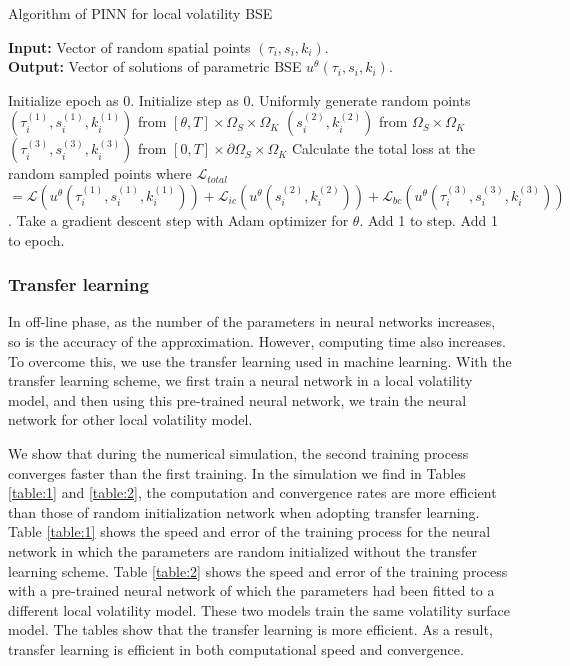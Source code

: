\documentclass[11pt,reqno]{article}
\numberwithin{equation}{section}
\begin{document}
{%
\begin{algorithm}[H]\small
\caption{Algorithm of PINN for local volatility BSE}
    \textbf{Input:}
    Vector of random spatial points $(\tau_i, s_i, k_i)$. \\
    \textbf{Output:}
    Vector of solutions of parametric BSE $u^{\theta}(\tau_i, s_i, k_i)$.
\begin{algorithmic}
    \State Initialize epoch as 0.
        \State Initialize step as 0.
        \State Uniformly generate random points
        \State $(\tau_i^{(1)},s_i^{(1)},k_i^{(1)})$ from $[\theta,T]\times\Omega_S\times\Omega_K$
        \State $(s_i^{(2)},k_i^{(2)})$ from $\Omega_S\times\Omega_K$
        \State $(\tau_i^{(3)},s_i^{(3)},k_i^{(3)})$ from $[0,T]\times \partial\Omega_S\times \Omega_K$
            \State Calculate the total loss at the random sampled points where ${\mathcal L}_{total}$
            \State $={\mathcal L}(u^\theta (\tau_i^{(1)},s_i^{(1)},k_i^{(1)}))
            	+{\mathcal L}_{ic} (u^\theta (s_i^{(2)},k_i^{(2)}))
			 	+{\mathcal L}_{bc} (u^\theta (\tau_i^{(3)},s_i^{(3)},k_i^{(3)}))$.
            \State Take a gradient descent step with Adam optimizer for $\theta$.
            \State Add 1 to step.
        \EndWhile
        \State Add 1 to epoch.
    \EndWhile
\end{algorithmic}
\end{algorithm}

\subsubsection{Transfer learning}\label{translearning}
In off-line phase, as the number of the parameters in neural networks increases, so is the accuracy of the approximation. However, computing time also increases. To overcome this, we use the transfer learning used in machine learning. With the transfer learning scheme, we first train a neural network in a local volatility model, and then using this pre-trained neural network, we train the neural network for other local volatility model. 

We show that during the numerical simulation, the second training process converges faster than the first training. In the simulation we find in Tables \ref{table:1} and \ref{table:2}, the computation and convergence rates are more efficient than those of random initialization network when adopting transfer learning. Table \ref{table:1} shows the speed and error of the training process for the neural network in which the parameters are random initialized without the transfer learning scheme. Table \ref{table:2} shows the speed and error of the training process with a pre-trained neural network of which the parameters had been fitted to a different local volatility model. These two models train the same volatility surface model. The tables show that the transfer learning is more efficient. As a result, transfer learning is efficient in both computational speed and convergence. 

}
\end{document}
